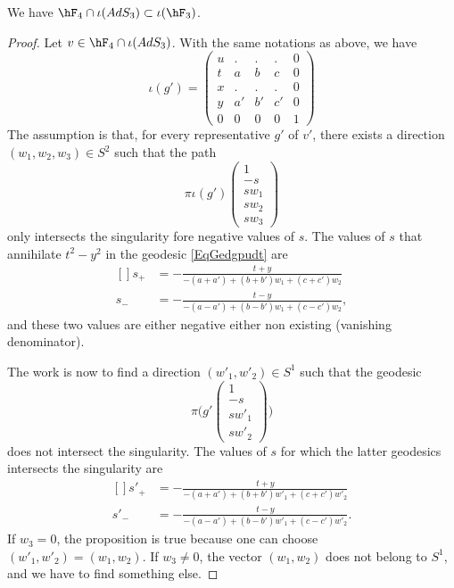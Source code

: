 \begin{proposition}		\label{PropFqTroisFt}
We have $\hF_4\cap\iota(AdS_3)\subset \iota(\hF_3)$.
\end{proposition}

\begin{proof}
Let $v\in\hF_4\cap\iota(AdS_3)$. With the same notations as above, we have
\begin{equation}		\label{EqRepresSOiotag}
	\iota(g')=
\begin{pmatrix}
 u	&	.	&	.	&	.	&	0\\
 t	&	a	&	b	&	c	&	0\\
 x	&	.	&	.	&	.	&	0\\
 y	&	a'	&	b'	&	c'	&	0\\
0	&	0	&	0	&	0	&	1
 \end{pmatrix}
\end{equation}
The assumption is that, for every representative $g'$ of $v'$, there exists a direction $(w_1,w_2,w_3)\in S^2$ such that the path
\begin{equation}		\label{EqGedgpudt}
	\pi   \iota(g')\begin{pmatrix}
	1	\\
	-s	\\
	sw_1	\\
	sw_2	\\
	sw_3
\end{pmatrix}
\end{equation}
only intersects the singularity fore negative values of $s$. The values of $s$ that annihilate $t^2-y^2$ in the geodesic \eqref{EqGedgpudt} are
\begin{equation}
	\begin{aligned}[]
		s_+	&=-\frac{ t+y }{ -(a+a')+(b+b')w_1+(c+c')w_2 }\\
		s_-	&=-\frac{ t-y }{ -(a-a')+(b-b')w_1+(c-c')w_2 },
	\end{aligned}
\end{equation}
and these two values are either negative either non existing (vanishing denominator).

The work is now to find a direction $(w'_1,w'_2)\in S^1$ such that the geodesic
\begin{equation}
	\pi\big( g'\begin{pmatrix}
	1	\\
	-s	\\
	sw'_1	\\
	sw'_2
\end{pmatrix} \big)
\end{equation}
does not intersect the singularity. The values of $s$ for which the latter geodesics intersects the singularity are
\begin{equation}
	\begin{aligned}[]
		s'_+	&=-\frac{ t+y }{ -(a+a')+(b+b')w'_1+(c+c')w'_2 }\\
		s'_-	&=-\frac{ t-y }{ -(a-a')+(b-b')w'_1+(c-c')w'_2 }.
	\end{aligned}
\end{equation}
If $w_3=0$, the proposition is true because one can choose $(w'_1,w'_2)=(w_1,w_2)$. If $w_3\neq 0$, the vector $(w_1,w_2)$ does not belong to $S^1$, and we have to find something else.


\end{proof}
